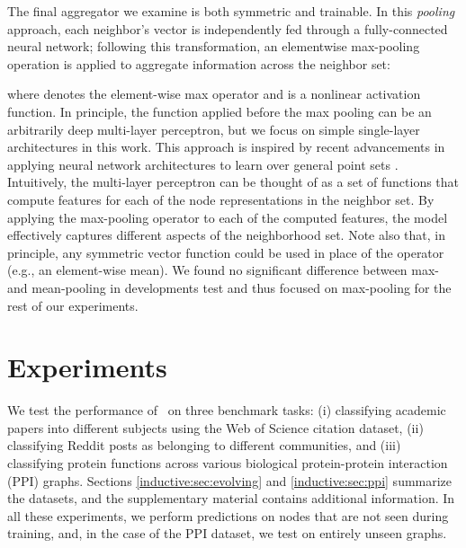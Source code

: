  The final aggregator we examine is both symmetric and trainable.
In this {\em pooling} approach, each neighbor's vector is independently fed through a fully-connected neural network; following this transformation, an elementwise max-pooling operation is applied to aggregate information across the neighbor set:

where  denotes the element-wise max operator and  is a nonlinear activation function. 
In principle, the function applied before the max pooling can be an arbitrarily deep multi-layer perceptron, but we focus on simple single-layer architectures in this work. 
This approach is inspired by recent advancements in applying neural network architectures to learn over general point sets \cite{qi2016pointnet}.
Intuitively, the multi-layer perceptron can be thought of as a set of functions that compute features for each of the node representations in the neighbor set. By applying the max-pooling operator to each of the computed features, the model effectively captures different aspects of the neighborhood set. 
Note also that, in principle, any symmetric vector function could be used in place of the  operator (e.g., an element-wise mean). 
We found no significant difference between max- and mean-pooling in developments test and thus focused on max-pooling for the rest of our experiments. 



\section{Experiments}
\label{inductive:sec:exp}

We test the performance of \name\ on three benchmark tasks: (i) classifying academic papers into different subjects using the Web of Science
citation dataset, (ii) classifying Reddit posts as belonging to different communities, and (iii) classifying protein functions across various biological protein-protein interaction (PPI) graphs. Sections \ref{inductive:sec:evolving} and \ref{inductive:sec:ppi} summarize the datasets, and the supplementary material contains additional information.
In all these experiments, we perform predictions on nodes that are not seen during training, and, in the case of the PPI dataset, we test on entirely unseen graphs. 


